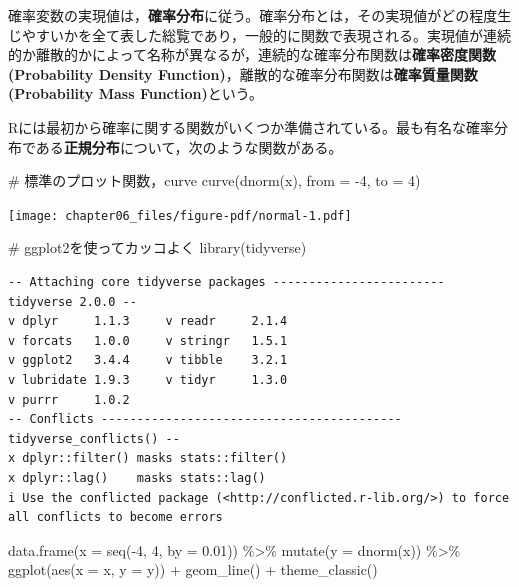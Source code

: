 \documentclass[
  a4paper,
]{ltjsbook}
\newenvironment{Shaded}{\begin{snugshade}}{\end{snugshade}}
\newcommand{\AttributeTok}[1]{\textcolor[rgb]{0.40,0.45,0.13}{#1}}
\newcommand{\CommentTok}[1]{\textcolor[rgb]{0.37,0.37,0.37}{#1}}
\newcommand{\DecValTok}[1]{\textcolor[rgb]{0.68,0.00,0.00}{#1}}
\newcommand{\FloatTok}[1]{\textcolor[rgb]{0.68,0.00,0.00}{#1}}
\newcommand{\FunctionTok}[1]{\textcolor[rgb]{0.28,0.35,0.67}{#1}}
\newcommand{\NormalTok}[1]{\textcolor[rgb]{0.00,0.23,0.31}{#1}}
\newcommand{\SpecialCharTok}[1]{\textcolor[rgb]{0.37,0.37,0.37}{#1}}
\begin{document}
確率変数の実現値は，\textbf{確率分布}に従う。確率分布とは，その実現値がどの程度生じやすいかを全て表した総覧であり，一般的に関数で表現される。実現値が連続的か離散的かによって名称が異なるが，連続的な確率分布関数は\textbf{確率密度関数(Probability
Density
Function)}，離散的な確率分布関数は\textbf{確率質量関数(Probability Mass
Function)}という。

Rには最初から確率に関する関数がいくつか準備されている。最も有名な確率分布である\textbf{正規分布}について，次のような関数がある。

\begin{Shaded}
\begin{Highlighting}[]
\CommentTok{\# 標準のプロット関数，curve}
\FunctionTok{curve}\NormalTok{(}\FunctionTok{dnorm}\NormalTok{(x), }\AttributeTok{from =} \SpecialCharTok{{-}}\DecValTok{4}\NormalTok{, }\AttributeTok{to =} \DecValTok{4}\NormalTok{)}
\end{Highlighting}
\end{Shaded}

\texttt{[image: chapter06\_files/figure-pdf/normal-1.pdf]}

\begin{Shaded}
\begin{Highlighting}[]
\CommentTok{\# ggplot2を使ってカッコよく}
\FunctionTok{library}\NormalTok{(tidyverse)}
\end{Highlighting}
\end{Shaded}

\begin{verbatim}
-- Attaching core tidyverse packages ------------------------ tidyverse 2.0.0 --
v dplyr     1.1.3     v readr     2.1.4
v forcats   1.0.0     v stringr   1.5.1
v ggplot2   3.4.4     v tibble    3.2.1
v lubridate 1.9.3     v tidyr     1.3.0
v purrr     1.0.2     
-- Conflicts ------------------------------------------ tidyverse_conflicts() --
x dplyr::filter() masks stats::filter()
x dplyr::lag()    masks stats::lag()
i Use the conflicted package (<http://conflicted.r-lib.org/>) to force all conflicts to become errors
\end{verbatim}

\begin{Shaded}
\begin{Highlighting}[]
\FunctionTok{data.frame}\NormalTok{(}\AttributeTok{x =} \FunctionTok{seq}\NormalTok{(}\SpecialCharTok{{-}}\DecValTok{4}\NormalTok{, }\DecValTok{4}\NormalTok{, }\AttributeTok{by =} \FloatTok{0.01}\NormalTok{)) }\SpecialCharTok{\%\textgreater{}\%}
  \FunctionTok{mutate}\NormalTok{(}\AttributeTok{y =} \FunctionTok{dnorm}\NormalTok{(x)) }\SpecialCharTok{\%\textgreater{}\%}
  \FunctionTok{ggplot}\NormalTok{(}\FunctionTok{aes}\NormalTok{(}\AttributeTok{x =}\NormalTok{ x, }\AttributeTok{y =}\NormalTok{ y)) }\SpecialCharTok{+}
  \FunctionTok{geom\_line}\NormalTok{() }\SpecialCharTok{+}
  \FunctionTok{theme\_classic}\NormalTok{()}
\end{Highlighting}
\end{Shaded}
\end{document}
